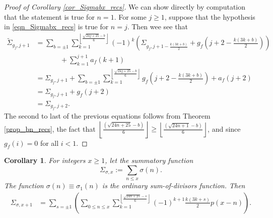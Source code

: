 \documentclass[12pt,reqno,a4letter]{article}
\numberwithin{figure}{section}
\numberwithin{table}{section}
\numberwithin{equation}{section}
\theoremstyle{plain}
\newtheorem{cor}[theorem]{Corollary}
\numberwithin{theorem}{section}
\theoremstyle{definition}
\begin{document}
\begin{proof}[Proof of Corollary \ref{cor_Sigmabx_recs}]
We can show directly by computation that the statement is true for $n = 1$. 
For some $j \geq 1$, suppose that the hypothesis in \eqref{eqn_Sigmabx_recs} is 
true for $n = j$. Then wee see that 
\begin{align*} 
\widetilde{\Sigma}_{g_f,j+1} & = 
     \sum_{b = \pm 1}  
     \sum_{k=1}^{\left\lfloor \frac{\sqrt{24j+25}-b}{6} \right\rfloor}
     (-1)^{k} \left(\Sigma_{g_f,j+1-\frac{k(3k+b)}{2}} + g_f\left(j+2-\frac{k(3k+b)}{2}\right)\right) \\ 
     & \phantom{=\sum1\ } + 
     \sum_{k=1}^{j+1} a_f(k+1) \\ 
\tag{by hypothesis} 
     & = 
     \Sigma_{g_f,j+1} + \sum_{b=\pm 1} 
     \sum_{k=1}^{\left\lfloor \frac{\sqrt{24j+25}-b}{6} \right\rfloor} 
     g_f\left(j+2-\frac{k(3k+b)}{2}\right) + a_f(j+2) \\ 
     & = 
     \Sigma_{g_f,j+1} + g_f(j+2) \\ 
     & = 
     \Sigma_{g_f,j+2}. 
\end{align*} 
The second to last of the previous equations follows from 
Theorem \ref{prop_bn_recs}, the fact that 
$\left\lfloor \frac{(\sqrt{24n+25}-b)}{6} \right\rfloor \geq \left\lfloor \frac{(\sqrt{24n+1}-b)}{6} \right\rfloor$, and 
since $g_f(i) = 0$ for all $i < 1$. 
\end{proof}

\begin{cor}
For integers $x \geq 1$, let the summatory function 
$$\Sigma_{\sigma,x} := \sum_{n \leq x} \sigma(n).$$ 
The function $\sigma(n) \equiv \sigma_1(n)$ is the ordinary sum-of-divisors function.
Then 
\begin{align*} 
\Sigma_{\sigma,x+1} & = \sum_{s = \pm 1} \left( \sum_{0 \leq n \leq x} 
     \sum_{k=1}^{\left\lfloor \frac{\sqrt{24n+25}-s}{6} \right\rfloor} 
     (-1)^{k+1} \frac{k(3k+s)}{2} p(x-n)\right). 
\end{align*} 
\end{cor}
\end{document}
